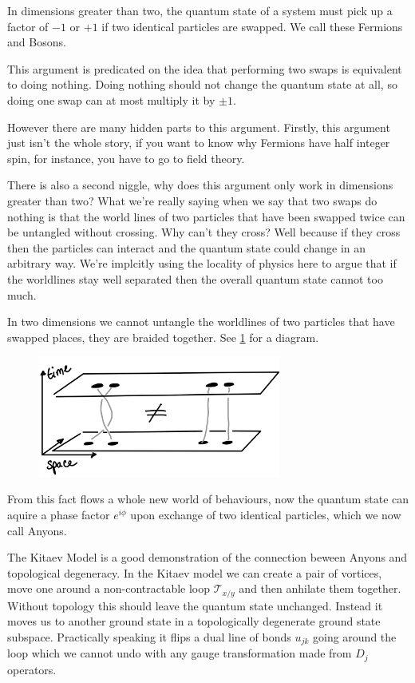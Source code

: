 In dimensions greater than two, the quantum state of a system must pick
up a factor of \(-1\) or \(+1\) if two identical particles are swapped.
We call these Fermions and Bosons.

This argument is predicated on the idea that performing two swaps is
equivalent to doing nothing. Doing nothing should not change the quantum
state at all, so doing one swap can at most multiply it by \(\pm 1\).

However there are many hidden parts to this argument. Firstly, this
argument just isn't the whole story, if you want to know why Fermions
have half integer spin, for instance, you have to go to field theory.

There is also a second niggle, why does this argument only work in
dimensions greater than two? What we're really saying when we say that
two swaps do nothing is that the world lines of two particles that have
been swapped twice can be untangled without crossing. Why can't they
cross? Well because if they cross then the particles can interact and
the quantum state could change in an arbitrary way. We're implcitly
using the locality of physics here to argue that if the worldlines stay
well separated then the overall quantum state cannot too much.

In two dimensions we cannot untangle the worldlines of two particles
that have swapped places, they are braided together. See
\cref{fig:braiding} for a diagram.

\begin{figure}
\hypertarget{fig:braiding}{%
\centering
\includegraphics[width=0.71\textwidth,height=\textheight]{figure_code/amk_chapter/braiding.png}
\caption{}\label{fig:braiding}
}
\end{figure}

From this fact flows a whole new world of behaviours, now the quantum
state can aquire a phase factor \(e^{i\phi}\) upon exchange of two
identical particles, which we now call Anyons.

The Kitaev Model is a good demonstration of the connection beween Anyons
and topological degeneracy. In the Kitaev model we can create a pair of
vortices, move one around a non-contractable loop \(\mathcal{T}_{x/y}\)
and then anhilate them together. Without topology this should leave the
quantum state unchanged. Instead it moves us to another ground state in
a topologically degenerate ground state subspace. Practically speaking
it flips a dual line of bonds \(u_{jk}\) going around the loop which we
cannot undo with any gauge transformation made from \(D_j\) operators.

